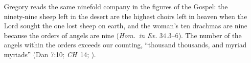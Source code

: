 Gregory reads the same ninefold company in the figures of the Gospel:
the ninety-nine sheep left in the desert are the highest choirs left in
heaven when the Lord sought the one lost sheep on earth, and the
woman's ten drachmas are nine because the orders of angels are nine
(\emph{Hom.\ in Ev.} 34.3--6). The number of the angels within the
orders exceeds our counting, ``thousand thousands, and myriad myriads''
(Dan 7:10; \emph{CH}~14; ).
